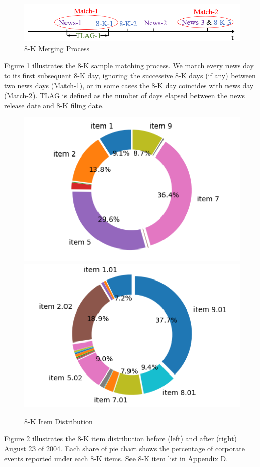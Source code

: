 \begin{figure}
	\caption{8-K Merging Process} \label{fig1}
	\begin{center}
		\includegraphics[scale=0.6]{../output/fig/fig1_matching.png}
	\end{center}
\end{figure}

Figure 1 illustrates the 8-K sample matching process. We match every news day to its first subsequent 8-K day, ignoring the successive 8-K days (if any) between two news days (Match-1), or in some cases the 8-K day coincides with news day (Match-2). TLAG is defined as the number of days elapsed between the news release date and 8-K filing date.

\begin{figure}[htbp]
	\begin{center}
		\caption{8-K Item Distribution} \label{fig2}
		\includegraphics[scale=0.5]{../output/fig/fig2_8-K_before.png}
		\includegraphics[scale=0.5]{../output/fig/fig2_8-K_after.png}
	\end{center}
\end{figure}

Figure 2 illustrates the 8-K item distribution before (left) and after (right) August 23 of 2004. Each share of pie chart shows the percentage of corporate events reported under each 8-K items. See 8-K item list in \hyperref[appd]{Appendix D}.